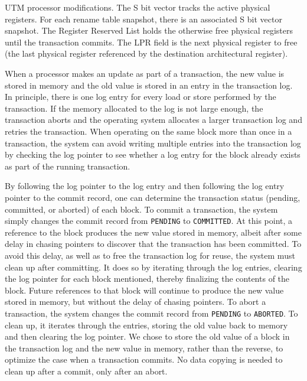 %
{UTM processor modifications. The S bit vector
tracks the active physical registers.  For each rename table snapshot,
there is an associated S bit vector snapshot.  The Register Reserved
List holds the otherwise free physical registers until the transaction
commits.  The LPR field is the next physical register to free (the
last physical register referenced by the destination architectural
register).}


When a processor makes an update as part of a transaction, the new
value is stored in memory and the old value is stored in an entry in
the transaction log.  In principle, there is one log entry for every
load or store performed by the transaction.  If the memory allocated
to the log  is not large enough, the
transaction aborts and the operating system allocates a larger
transaction log and retries the transaction.  When
operating on the same block more than once in a transaction, the
system can avoid writing multiple entries into the transaction log by
checking the log pointer to see whether a log entry for the block
already exists as part of the running transaction.

By following the log pointer to the log entry and then following the log
entry pointer to the commit record, one can determine the transaction
status (pending, committed, or aborted) of each block.  To commit a
transaction, the system simply changes the commit record from
\texttt{PENDING} to \texttt{COMMITTED}\@.  At this point, a reference to
the block produces the new value stored in memory, albeit after some
delay in chasing pointers to discover that the transaction has been
committed.  To avoid this delay, as well as to free the transaction
log for reuse, the system must clean up after committing.  It does so
by iterating through the log entries, clearing the log pointer for
each block mentioned, thereby finalizing the contents of the block.
Future references to that block will continue to produce the new value
stored in memory, but without the delay of chasing pointers.  To abort
a transaction, the system changes the commit record from
\texttt{PENDING} to \texttt{ABORTED}\@.  To clean up, it iterates
through the entries, storing the old value back to memory and then
clearing the log pointer.  We chose to store the old value of a block
in the transaction log and the new value in memory, rather than the
reverse, to optimize the case when a transaction commits.  No data
copying is needed to clean up after a commit, only after an abort.

